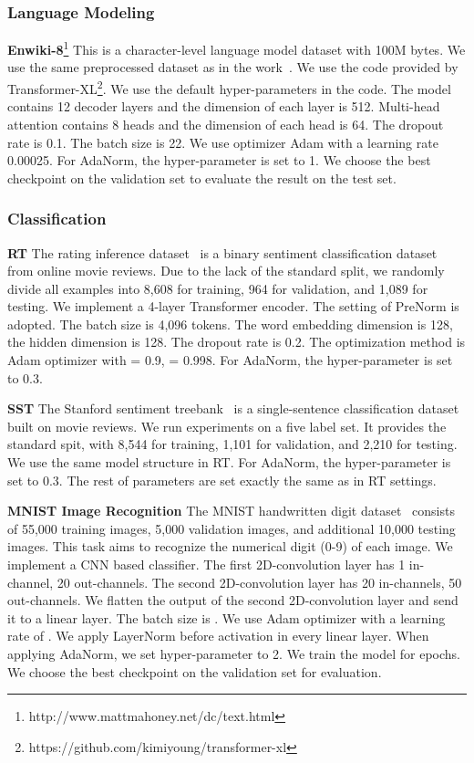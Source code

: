 \documentclass{article}
\begin{document}
\subsubsection{Language Modeling}
\textbf{Enwiki-8}\footnote{http://www.mattmahoney.net/dc/text.html} This is a character-level language model dataset with 100M bytes.  We use the same preprocessed dataset as in the work~\citep{DBLP:conf/iclr/ChungAB17}.  We use the code provided by Transformer-XL\footnote{https://github.com/kimiyoung/transformer-xl }. We use the default hyper-parameters in the code. The model contains 12 decoder layers and the dimension of each layer is 512. Multi-head attention contains 8 heads and the dimension of each head is 64. The dropout rate is 0.1. The batch size is 22. We use optimizer Adam  with a learning rate 0.00025.  For AdaNorm, the hyper-parameter  is set to 1. We choose the best checkpoint on the validation set to evaluate the result on the test set.

\subsubsection{Classification}





\textbf{RT} The rating inference dataset~\citep{PangLee} is a binary  sentiment classification dataset from online movie reviews. Due to the lack of the standard split, we randomly divide all examples into 8,608 for training, 964 for validation, and 1,089 for testing. We implement a 4-layer Transformer encoder. The setting of PreNorm is adopted. The batch size is 4,096 tokens. The word embedding dimension is 128,  the hidden dimension is 128. The dropout rate is 0.2.   The optimization method is Adam optimizer  with  = 0.9,   = 0.998. For AdaNorm, the hyper-parameter  is set to 0.3. 

\textbf{SST} The Stanford sentiment treebank~\citep{socher2013recursive} is a single-sentence classification dataset built on movie reviews.  We run experiments on a five label set. It provides the standard spit, with 8,544 for training, 1,101 for validation, and 2,210 for testing. We use the same model structure in RT. For AdaNorm, the hyper-parameter  is set to 0.3. The rest of parameters are set exactly the same as in RT settings. 

\textbf{MNIST Image Recognition} \quad The MNIST handwritten digit dataset~\citep{lecun1998gradient} consists of 55,000 training images, 5,000 validation images, and additional 10,000 testing images. This task aims to recognize the numerical digit (0-9) of each image. We implement a CNN based classifier. The first 2D-convolution layer has 1 in-channel, 20 out-channels. The second 2D-convolution layer has 20 in-channels, 50 out-channels. We flatten the output of the second 2D-convolution layer and send it to a linear layer. The batch size is  . We use Adam optimizer with a learning rate of . We apply LayerNorm before activation in every linear layer. When applying AdaNorm, we set hyper-parameter  to 2. We train the model for  epochs. We choose the best checkpoint on the validation set for evaluation.
\end{document}
